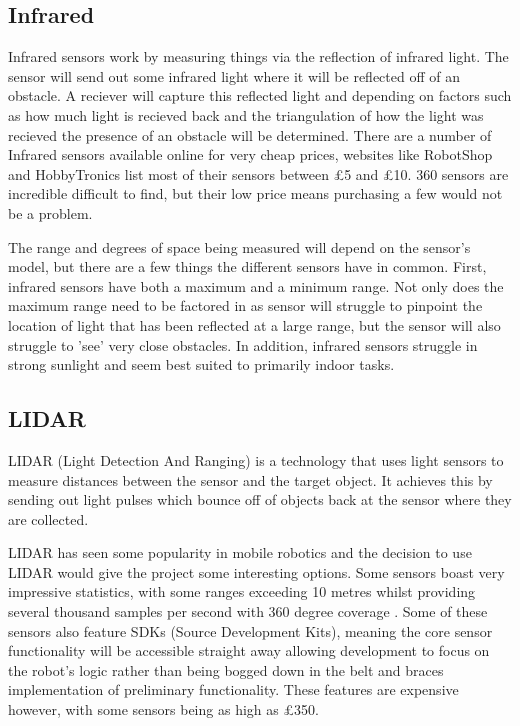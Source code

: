 				\subsection{Infrared}
				Infrared sensors work by measuring things via the reflection of infrared light. The sensor will send out some infrared light where it will be reflected off of an obstacle. A reciever will capture this reflected light and depending on factors such as how much light is recieved back and the triangulation of how the light was recieved the presence of an obstacle will be determined. There are a number of Infrared sensors available online for very cheap prices, websites like RobotShop and HobbyTronics list most of their sensors between \pounds{5} and \pounds{10}. 360 sensors are incredible difficult to find, but their low price means purchasing a few would not be a problem.
				
				The range and degrees of space being measured will depend on the sensor's model, but there are a few things the different sensors have in common. First, infrared sensors have both a maximum and a minimum range. Not only does the maximum range need to be factored in as sensor will struggle to pinpoint the location of light that has been reflected at a large range, but the sensor will also struggle to 'see' very close obstacles. In addition, infrared sensors struggle in strong sunlight and seem best suited to primarily indoor tasks.
				
				
				\subsection{LIDAR}
				LIDAR (Light Detection And Ranging) is a technology that uses light sensors to measure distances between the sensor and the target object. It achieves this by sending out light pulses which bounce off of objects back at the sensor where they are collected.
				
				LIDAR has seen some popularity in mobile robotics and the decision to use LIDAR would give the project some interesting options. Some sensors boast very impressive statistics, with some ranges exceeding 10 metres whilst providing several thousand samples per second with 360 degree coverage \citep{slamtecA1M8}. Some of these sensors also feature SDKs (Source Development Kits), meaning the core sensor functionality will be accessible straight away allowing development to focus on the robot's logic rather than being bogged down in the belt and braces implementation of preliminary functionality. These features are expensive however, with some sensors being as high as \pounds{350}.
				
